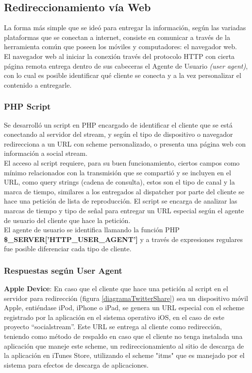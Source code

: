 	\subsection{Redireccionamiento vía Web}
La forma más simple que se ideó para entregar la información, según las variadas plataformas que se conectan a internet, consiste en comunicar a través de la herramienta común que poseen los móviles y computadores: el navegador web.\\

El navegador web al iniciar la conexión través del protocolo HTTP con cierta página remota entrega dentro de sus cabeceras el Agente de Usuario \textit{(user agent)}, con lo cual es posible identificar qué cliente se conecta y a la vez personalizar el contenido a entregarle.

		\subsubsection{PHP Script}
		\label{subsec:php-redir}
Se desarrolló un script en PHP encargado de identificar el cliente que se está conectando al servidor del stream, y según el tipo de dispositivo o navegador redirecciona a un URL con scheme personalizado, o presenta una página web con información a social stream.\\

El acceso al script requiere, para su buen funcionamiento, ciertos campos como mínimo relacionados con la transmisión que se compartió y se incluyen en el URL, como query strings (cadena de consulta), estos son el tipo de canal y la marca de tiempo, similares a los entregados al dispatcher por parte del cliente se hace una petición de lista de reproducción.
El script se encarga de analizar las marcas de tiempo y tipo de señal para entregar un URL especial según el agente de usuario del cliente que hace la petición.\\

El agente de usuario se identifica llamando la función PHP \textbf{\$\_SERVER['HTTP\_USER\_AGENT']} y a través de expresiones regulares fue posible diferenciar cada tipo de cliente.

		\subsubsection{Respuestas según User Agent}
\textbf{Apple Device}: En caso que el cliente que hace una petición al script en el servidor para redirección (figura \ref{diagramaTwitterShare}) sea un dispositivo móvil Apple, entiéndase iPod, iPhone o iPad, se genera un URL especial con el scheme registrado por la aplicación en el sistema operativo iOS, en el caso de este proyecto \textquotedblleft socialstream\textquotedblright . Este URL se entrega al cliente como redirección, teniendo como método de respaldo en caso que el cliente no tenga instalada una aplicación que maneje este scheme, un redireccionamiento al sitio de descarga de la aplicación en iTunes Store, utilizando el scheme "itms" que es manejado por el sistema para efectos de descarga de aplicaciones. \\ 


